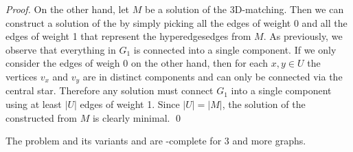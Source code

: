 \begin{proof}
On the other hand, let $M$ be a solution of the 3D-matching. Then we can construct a solution of the \SMST by simply picking all the edges of weight 0 and all the edges of weight 1 that represent the hyperedgesedges from $M$. As previously, we observe that everything in $G_1$ is connected into a single component. If we only consider the edges of weigh 0 on the other hand, then for each $x,y \in U$ the vertices $v_x$ and $v_y$ are in distinct components and can only be connected via the central star. Therefore any solution must connect $G_1$ into a single component using at least $|U|$ edges of weight 1. Since $|U| = |M|$, the solution of the \SMST constructed from $M$ is clearly minimal. \qed
\end{proof}

\begin{corollary}
The problem \SMST and its variants \OISMST and \POISMST are \NP-complete for 3 and more graphs.
\end{corollary}